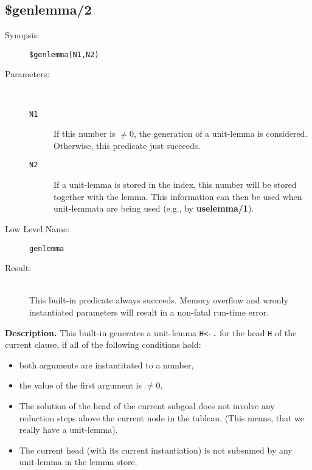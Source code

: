 %
%
%
\subsection{\$genlemma/2}\label{subsec:built-in-genlemma}

\begin{description}
\item[Synopsis:]
	{\tt \$genlemma(N1,N2)}
\item[Parameters:]\ \\[-0.5cm]
	\begin{description}
	\item[{\tt N1}]
	If this number is $\neq 0$, the generation of a unit-lemma
	is considered. Otherwise, this predicate just succeeds.
	\item[{\tt N2}]
	If a unit-lemma is stored in the index, this number will be
	stored together with the lemma. This information can then
	be used when unit-lemmata are being used (e.g., by {\bf uselemma/1}).
	\end{description}
\item[Low Level Name:]
	{\tt genlemma}
\item[Result:]\ \\
	This built-in predicate always succeeds. Memory overflow and
	wronly instantiated parameters will result in a 
	non-fatal run-time error.
\end{description}

\vspace*{0.5cm}
\noindent
{\bf Description.}
This built-in generates a unit-lemma {\tt H<-.} for the
head {\tt H} of the current clause, if all of the following
conditions hold:
\begin{itemize}
\item
both arguments are instantitated to a number,
\item
the value of the first argument is $\neq 0$,
\item
The solution of the head of the current subgoal does not involve
any reduction steps above the current node in the tableau.
(This means, that we really have a unit-lemma).
\item
The current head (with its current instantiation) is not subsumed
by any unit-lemma in the lemma store.
\end{itemize}

